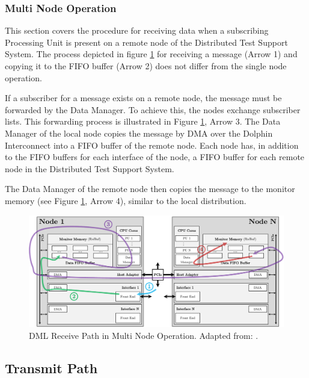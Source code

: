 \subsubsection{Multi Node Operation}
This section covers the procedure for receiving data when a subscribing Processing Unit is present on a remote node of the Distributed Test Support System. The process depicted in figure \ref{fig:DmlRecMultiNode} for receiving a message (Arrow 1) and copying it to the FIFO buffer (Arrow 2) does not differ from the single node operation.

If a subscriber for a message exists on a remote node, the message must be forwarded by the Data Manager. To achieve this, the nodes exchange subscriber lists. This forwarding process is illustrated in Figure \ref{fig:DmlRecMultiNode}, Arrow 3. The Data Manager of the local node copies the message by DMA over the Dolphin Interconnect into a FIFO buffer of the remote node. Each node has, in addition to the FIFO buffers for each interface of the node, a FIFO buffer for each remote node in the Distributed Test Support System.

The Data Manager of the remote node then copies the message to the monitor memory (see Figure \ref{fig:DmlRecMultiNode}, Arrow 4), similar to the local distribution. \\

\begin{figure}[h!]
    \centering
    \includegraphics[width=\linewidth]{figures/dml/dml02b.pdf}
    \caption[DML Receive Path in Multi Node Operation]{DML Receive Path in Multi Node Operation. Adapted from: \cite{dml01}.}
    \label{fig:DmlRecMultiNode}
\end{figure}



\subsection{Transmit Path}

